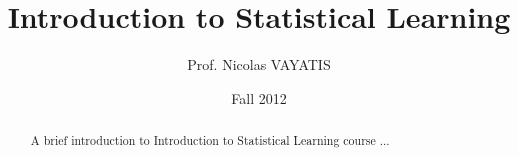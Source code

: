 \documentclass[]{report}   %
\begin{document}
	\title{Introduction to Statistical Learning}   %
	\author{Prof. Nicolas VAYATIS}         %
	\date{Fall 2012}    %
	\maketitle

	\begin{abstract}
      A brief introduction to Introduction to Statistical Learning course ...
	\end{abstract}

	\tableofcontents

	
	
	
	
	

	


	
	
\end{document}
